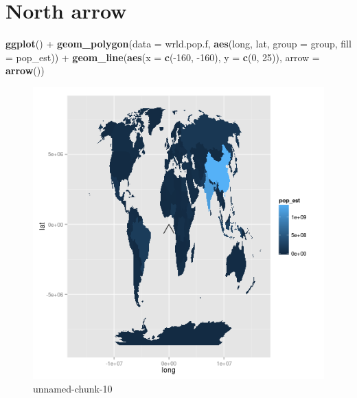 \documentclass[]{article}
\makeatletter
\newenvironment{Shaded}{}{}
\newcommand{\KeywordTok}[1]{\textcolor[rgb]{0.00,0.44,0.13}{\textbf{{#1}}}}
\newcommand{\DataTypeTok}[1]{\textcolor[rgb]{0.56,0.13,0.00}{{#1}}}
\newcommand{\DecValTok}[1]{\textcolor[rgb]{0.25,0.63,0.44}{{#1}}}
\newcommand{\StringTok}[1]{\textcolor[rgb]{0.25,0.44,0.63}{{#1}}}
\newcommand{\NormalTok}[1]{{#1}}
\def\maxwidth{\ifdim\Gin@nat@width>\linewidth\linewidth
\else\Gin@nat@width\fi}
\let\Oldincludegraphics\includegraphics
\renewcommand{\includegraphics}[1]{\Oldincludegraphics[width=\maxwidth]{#1}}
\makeatother
\begin{document}
\section{North arrow}

\begin{Shaded}
\begin{Highlighting}[]
\KeywordTok{ggplot}\NormalTok{() +}\StringTok{ }\KeywordTok{geom_polygon}\NormalTok{(}\DataTypeTok{data =} \NormalTok{wrld.pop.f, }\KeywordTok{aes}\NormalTok{(long, lat, }\DataTypeTok{group =} \NormalTok{group, }\DataTypeTok{fill =} \NormalTok{pop_est)) +}\StringTok{ }
\StringTok{    }\KeywordTok{geom_line}\NormalTok{(}\KeywordTok{aes}\NormalTok{(}\DataTypeTok{x =} \KeywordTok{c}\NormalTok{(-}\DecValTok{160}\NormalTok{, -}\DecValTok{160}\NormalTok{), }\DataTypeTok{y =} \KeywordTok{c}\NormalTok{(}\DecValTok{0}\NormalTok{, }\DecValTok{25}\NormalTok{)), }\DataTypeTok{arrow =} \KeywordTok{arrow}\NormalTok{())}
\end{Highlighting}
\end{Shaded}

\begin{figure}[htbp]
\centering
\includegraphics{figure/unnamed-chunk-10.png}
\caption{unnamed-chunk-10}
\end{figure}
\end{document}
